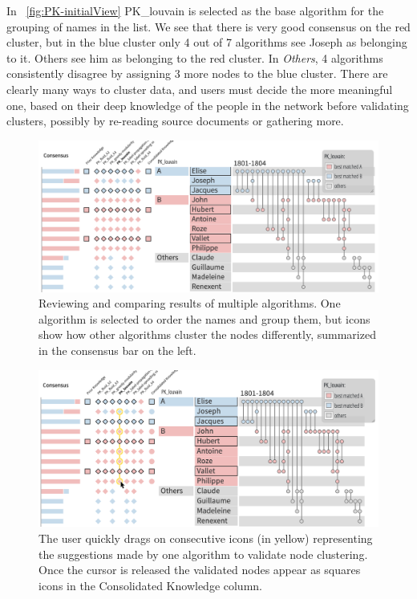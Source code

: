 In ~\autoref{fig:PK-initialView} PK\_louvain is selected as the base algorithm for the grouping of names in the list. We see that there is very good consensus on the red cluster, but in the blue cluster only 4 out of 7 algorithms see Joseph as belonging to it.  Others see him as belonging to the red cluster. In \emph{Others}, 4 algorithms consistently disagree by assigning 3 more nodes to the blue cluster.
There are clearly many ways to cluster data, and users must decide the more meaningful one, based on their deep knowledge of the people in the network before validating clusters, possibly by re-reading source documents or gathering more.

\begin{figure}
\centering
\includegraphics[width=\linewidth]{static/figures/PK-Clustering/VISPaperFigures/Small-initial.png}
\caption{Reviewing and comparing results of multiple algorithms. One algorithm is selected to order the names and group them, but icons show how other algorithms cluster the nodes differently, summarized in the consensus bar on the left.}
\label{fig:PK-initialView}
\end{figure}


\begin{figure}
\centering
\includegraphics[width=\linewidth]{static/figures/PK-Clustering/VISPaperFigures/Small-validating.png}
\caption{The user quickly drags on consecutive icons (in yellow) representing the suggestions made by one algorithm to validate node clustering. Once the cursor is released the validated nodes appear as squares icons in the Consolidated Knowledge column.}
\label{fig:PK-multipleValidation}
\end{figure}

